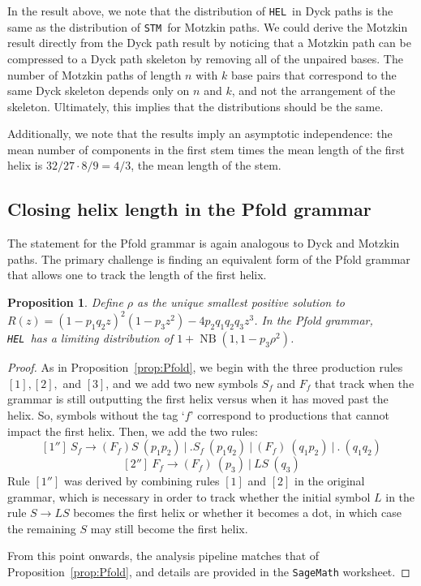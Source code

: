 \documentclass{article}
\DeclareMathOperator{\NB}{NB}
\newtheorem{proposition}[theorem]{Proposition}
\newcommand{\HEL}{{\tt HEL}}
\newcommand{\STM}{{\tt STM}}
\begin{document}
In the result above, we note that the distribution of \HEL\ in Dyck paths is the same as the distribution of \STM\ for Motzkin paths.  We could derive the Motzkin result directly from the Dyck path result by noticing that a Motzkin path can be compressed to a Dyck path skeleton by removing all of the unpaired bases.  The number of Motzkin paths of length $n$ with $k$ base pairs that correspond to the same Dyck skeleton depends only on $n$ and $k$, and not the arrangement of the skeleton.  Ultimately, this implies that the distributions should be the same.

Additionally, we note that the results imply an asymptotic independence: the mean number of components in the first stem times the mean length of the first helix is $32/27 \cdot 8/9 = 4/3$, the mean length of the stem.

\subsection{Closing helix length in the Pfold grammar}

The statement for the Pfold grammar is again analogous to Dyck and Motzkin paths.  The primary challenge is finding an equivalent form of the Pfold grammar that allows one to track the length of the first helix.

\begin{proposition} \label{prop:PfoldHelix}
    Define $\rho$ as the unique smallest positive solution to $R(z) = (1 - p_1q_2z)^2(1-p_3z^2) - 4p_2q_1q_2q_3z^3$.  In the Pfold grammar, \HEL\ has a limiting distribution of $1 + \NB(1, 1-p_3\rho^2)$.
\end{proposition}

\begin{proof}
    As in Proposition~\ref{prop:Pfold}, we begin with the three production rules $[1], [2],$ and $[3]$, and we add two new symbols $S_f$ and $F_f$ that track when the grammar is still outputting the first helix versus when it has moved past the helix.  So, symbols without the tag `$f$' correspond to productions that cannot impact the first helix.  Then, we add the two rules:
    \[
    [1'']\ S_f \to (F_f)S \ (p_1p_2) \ \big| \ .S_f \ (p_1q_2) \ \big| \ (F_f) \ (q_1p_2) \ \big| \ . \ (q_1q_2)
    \]
    \[
    [2'']\ F_f \to (F_f) \ (p_3) \ \big| \ LS \ (q_3)
    \]
    Rule $[1'']$ was derived by combining rules $[1]$ and $[2]$ in the original grammar, which is necessary in order to track whether the initial symbol $L$ in the rule $S \to LS$ becomes the first helix or whether it becomes a dot, in which case the remaining $S$ may still become the first helix.

    From this point onwards, the analysis pipeline matches that of Proposition~\ref{prop:Pfold}, and details are provided in the {\tt SageMath} worksheet.
\end{proof}
\end{document}
